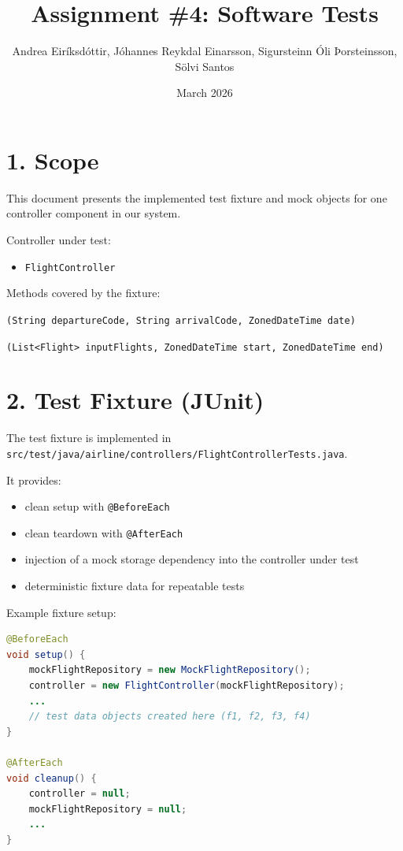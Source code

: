 \documentclass[11pt,a4paper]{article}
\title{Assignment \#4: Software Tests}
\author{
Andrea Eiríksdóttir, Jóhannes Reykdal Einarsson, Sigursteinn Óli Þorsteinsson, Sölvi Santos
}
\date{March 2026}
\begin{document}
\maketitle

\section*{1. Scope}
This document presents the implemented test fixture and mock objects for one controller component in our system.

Controller under test:
\begin{itemize}
    \item \texttt{FlightController}
\end{itemize}

Methods covered by the fixture:
\begin{description}[leftmargin=2.5em]
    \item[\texttt{searchFlights}] \nolinkurl{(String departureCode, String arrivalCode, ZonedDateTime date)}
    \item[\texttt{filterByDepartureTimeRange}] \nolinkurl{(List<Flight> inputFlights, ZonedDateTime start, ZonedDateTime end)}
\end{description}

\section*{2. Test Fixture (JUnit)}
The test fixture is implemented in \texttt{src/test/java/airline/controllers/FlightControllerTests.java}.

It provides:
\begin{itemize}
    \item clean setup with \texttt{@BeforeEach}
    \item clean teardown with \texttt{@AfterEach}
    \item injection of a mock storage dependency into the controller under test
    \item deterministic fixture data for repeatable tests
\end{itemize}

Example fixture setup:
\begin{lstlisting}[language=Java,caption={Fixture setup and teardown (excerpt)}]
@BeforeEach
void setup() {
    mockFlightRepository = new MockFlightRepository();
    controller = new FlightController(mockFlightRepository);
    ...
    // test data objects created here (f1, f2, f3, f4)
}

@AfterEach
void cleanup() {
    controller = null;
    mockFlightRepository = null;
    ...
}
\end{lstlisting}
\end{document}
